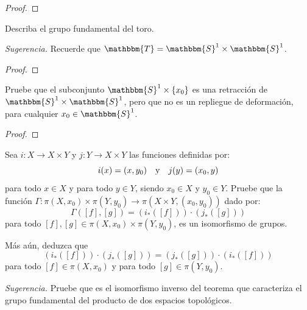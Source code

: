 \documentclass[12pt]{report}
\theoremstyle{largebreak}
\newcommand\cf[3]{\ensuremath{#1:#2\rightarrow#3}}
\newcommand{\bbm}[1]{\ensuremath{\mathbbm{#1}}}
\begin{document}
    \begin{proof}
        
    \end{proof}
    
    \begin{excer}
        Describa el grupo fundamental del toro.

        \textit{Sugerencia.} Recuerde que $\bbm{T}=\bbm{S}^1\times\bbm{S}^1$.
    \end{excer}

    \begin{proof}
        
    \end{proof}

    \begin{excer}
        Pruebe que el subconjunto $\bbm{S}^1\times\left\{x_0 \right\}$ es una retracción de $\bbm{S}^1\times\bbm{S}^1$, pero que no es un repliegue de deformación, para cualquier $x_0\in\bbm{S}^1$.
    \end{excer}

    \begin{proof}
        
    \end{proof}

    \begin{excer}
        Sea $\cf{i}{X}{X\times Y}$ y $\cf{j}{Y}{X\times Y}$ las funciones definidas por:
        \begin{equation*}
            i(x)=(x,y_0)\quad\textup{y}\quad j(y)=(x_0,y)
        \end{equation*}
        para todo $x\in X$ y para todo $y\in Y$, siendo $x_0\in X$ y $y_0\in Y$. Pruebe que la función $\cf{\Gamma}{\pi(X,x_0)\times\pi(Y,y_0)}{\pi(X\times Y,(x_0,y_0))}$ dado por:
        \begin{equation*}
            \Gamma([f],[g])=(i_*([f]))\cdot(j_*([g]))
        \end{equation*}
        para todo $[f],[g]\in\pi(X,x_0)\times\pi(Y,y_0)$, es un isomorfismo de grupos.

        Más aún, deduzca que
        \begin{equation*}
            (i_*([f]))\cdot(j_*([g]))=(j_*([g]))\cdot(i_*([f]))
        \end{equation*}
        para todo $[f]\in\pi(X,x_0)$ y para todo $[g]\in\pi(Y,y_0)$.

        \textit{Sugerencia.} Pruebe que es el isomorfismo inverso del teorema que caracteriza el grupo fundamental del producto de dos espacios topológicos. 
    \end{excer}
\end{document}
